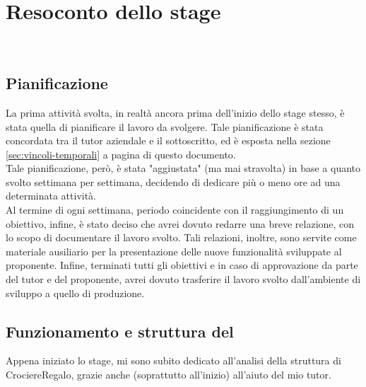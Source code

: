
\chapter{Resoconto dello stage}
\label{cap:resoconto-stage}

\\

\section{Pianificazione}
La prima attività svolta, in realtà ancora prima dell'inizio dello stage stesso, è stata quella di pianificare il lavoro da svolgere. Tale pianificazione è stata concordata tra il tutor aziendale e il sottoscritto, ed è esposta nella sezione \ref{sec:vincoli-temporali} a pagina \pageref{sec:vincoli-temporali} di questo documento.\\
Tale pianificazione, però, è stata "aggiustata" (ma mai stravolta) in base a quanto svolto settimana per settimana, decidendo di dedicare più o meno ore ad una determinata attività.\\
Al termine di ogni settimana, periodo coincidente con il raggiungimento di un obiettivo, infine, è stato deciso che avrei dovuto redarre una breve relazione, con lo scopo di documentare il lavoro svolto. Tali relazioni, inoltre, sono servite come materiale ausiliario per la presentazione delle nuove funzionalità sviluppate al proponente. Infine, terminati tutti gli obiettivi e in caso di approvazione da parte del tutor e del proponente, avrei dovuto trasferire il lavoro svolto dall'ambiente di sviluppo a quello di produzione.

\section{Funzionamento e struttura del \bookingEngine}
Appena iniziato lo stage, mi sono subito dedicato all'analisi della struttura di CrociereRegalo, grazie anche (soprattutto all'inizio) all'aiuto del mio tutor. 
